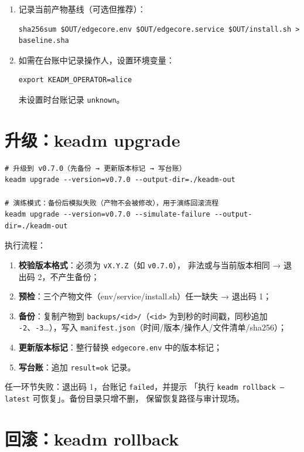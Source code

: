 \begin{enumerate}
  \item 记录当前产物基线（可选但推荐）：
\begin{lstlisting}
sha256sum $OUT/edgecore.env $OUT/edgecore.service $OUT/install.sh > baseline.sha
\end{lstlisting}
  \item 如需在台账中记录操作人，设置环境变量：
\begin{lstlisting}
export KEADM_OPERATOR=alice
\end{lstlisting}
        未设置时台账记录 \texttt{unknown}。
\end{enumerate}

\section{升级：keadm upgrade}

\begin{lstlisting}
# 升级到 v0.7.0（先备份 → 更新版本标记 → 写台账）
keadm upgrade --version=v0.7.0 --output-dir=./keadm-out

# 演练模式：备份后模拟失败（产物不会被修改），用于演练回滚流程
keadm upgrade --version=v0.7.0 --simulate-failure --output-dir=./keadm-out
\end{lstlisting}

执行流程：

\begin{enumerate}
  \item \textbf{校验版本格式}：必须为 \texttt{vX.Y.Z}（如 \texttt{v0.7.0}），
        非法或与当前版本相同 → 退出码 2，不产生备份；
  \item \textbf{预检}：三个产物文件（env/service/install.sh）任一缺失 →
        退出码 1；
  \item \textbf{备份}：复制产物到 \texttt{backups/<id>/}（\texttt{<id>}
        为到秒的时间戳，同秒追加 \texttt{-2}、\texttt{-3}\ldots），写入
        \texttt{manifest.json}（时间/版本/操作人/文件清单/sha256）；
  \item \textbf{更新版本标记}：整行替换 \texttt{edgecore.env} 中的版本标记；
  \item \textbf{写台账}：追加 \texttt{result=ok} 记录。
\end{enumerate}

任一环节失败：退出码 1，台账记 \texttt{failed}，并提示
「执行 \texttt{keadm rollback --latest} 可恢复」。备份目录只增不删，
保留恢复路径与审计现场。

\section{回滚：keadm rollback}

